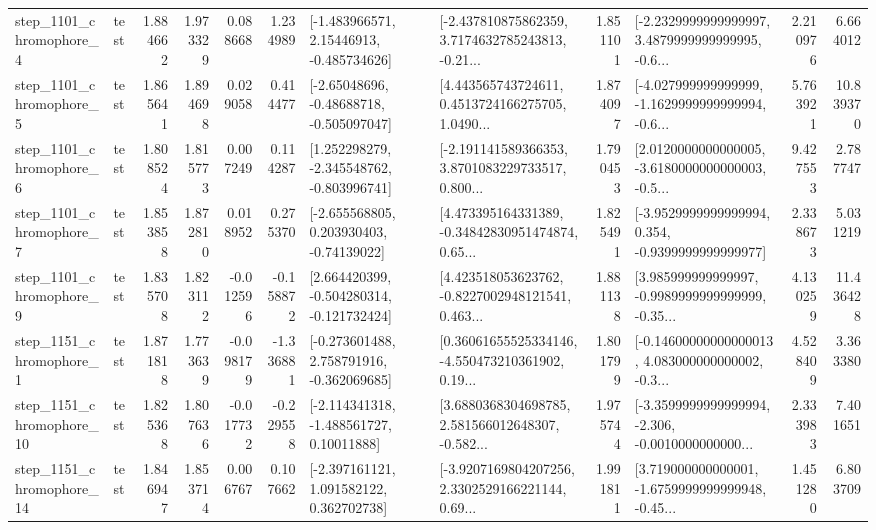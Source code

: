 \begin{tabular}{llrrrrllrlrr}
  step\_1101\_chromophore\_4 &      test &      1.884662 &    1.973329 &      0.088668 &  1.234989 &    [-1.483966571, 2.15446913, -0.485734626] &  [-2.437810875862359, 3.7174632785243813, -0.21... &       1.851101 &  [-2.2329999999999997, 3.4879999999999995, -0.6... &            2.210976 &          6.664012 \\
  step\_1101\_chromophore\_5 &      test &      1.865641 &    1.894698 &      0.029058 &  0.414477 &    [-2.65048696, -0.48688718, -0.505097047] &  [4.443565743724611, 0.4513724166275705, 1.0490... &       1.874097 &  [-4.027999999999999, -1.1629999999999994, -0.6... &            5.763921 &         10.839370 \\
  step\_1101\_chromophore\_6 &      test &      1.808524 &    1.815773 &      0.007249 &  0.114287 &   [1.252298279, -2.345548762, -0.803996741] &  [-2.191141589366353, 3.8701083229733517, 0.800... &       1.790453 &  [2.0120000000000005, -3.6180000000000003, -0.5... &            9.427553 &          2.787747 \\
  step\_1101\_chromophore\_7 &      test &      1.853858 &    1.872810 &      0.018952 &  0.275370 &    [-2.655568805, 0.203930403, -0.74139022] &  [4.473395164331389, -0.34842830951474874, 0.65... &       1.825491 &  [-3.9529999999999994, 0.354, -0.9399999999999977] &            2.338673 &          5.031219 \\
  step\_1101\_chromophore\_9 &      test &      1.835708 &    1.823112 &     -0.012596 & -0.158872 &   [2.664420399, -0.504280314, -0.121732424] &  [4.423518053623762, -0.8227002948121541, 0.463... &       1.881138 &  [3.985999999999997, -0.9989999999999999, -0.35... &            4.130259 &         11.436428 \\
  step\_1151\_chromophore\_1 &      test &      1.871818 &    1.773639 &     -0.098179 & -1.336881 &   [-0.273601488, 2.758791916, -0.362069685] &  [0.36061655525334146, -4.550473210361902, 0.19... &       1.801799 &  [-0.14600000000000013, 4.083000000000002, -0.3... &            4.528409 &          3.363380 \\
 step\_1151\_chromophore\_10 &      test &      1.825368 &    1.807636 &     -0.017732 & -0.229558 &    [-2.114341318, -1.488561727, 0.10011888] &  [3.6880368304698785, 2.581566012648307, -0.582... &       1.975744 &  [-3.3599999999999994, -2.306, -0.0010000000000... &            2.333983 &          7.401651 \\
 step\_1151\_chromophore\_14 &      test &      1.846947 &    1.853714 &      0.006767 &  0.107662 &    [-2.397161121, 1.091582122, 0.362702738] &  [-3.9207169804207256, 2.3302529166221144, 0.69... &       1.991811 &  [3.719000000000001, -1.6759999999999948, -0.45... &            1.451280 &          6.803709 \\

\end{tabular}
